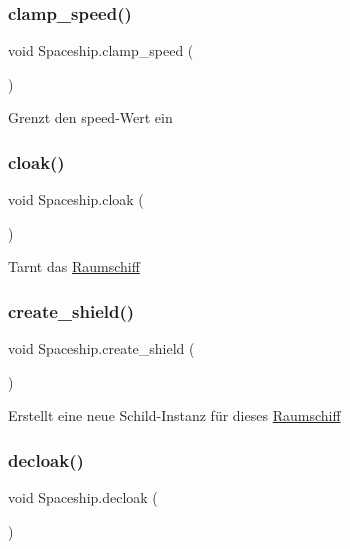 \subsubsection{\texorpdfstring{clamp\+\_\+speed()}{clamp\_speed()}}
{\footnotesize\ttfamily void Spaceship.\+clamp\+\_\+speed (\begin{DoxyParamCaption}{ }\end{DoxyParamCaption})}



Grenzt den speed-\/\+Wert ein 

\mbox{\label{class_spaceship_a06f201982238a71b99c5f065d48c3acc}} 
\subsubsection{\texorpdfstring{cloak()}{cloak()}}
{\footnotesize\ttfamily void Spaceship.\+cloak (\begin{DoxyParamCaption}{ }\end{DoxyParamCaption})}



Tarnt das \hyperlink{class_raumschiff}{Raumschiff} 

\mbox{\label{class_spaceship_a686609169faa9dec55c5da096581beec}} 
\subsubsection{\texorpdfstring{create\+\_\+shield()}{create\_shield()}}
{\footnotesize\ttfamily void Spaceship.\+create\+\_\+shield (\begin{DoxyParamCaption}{ }\end{DoxyParamCaption})}



Erstellt eine neue Schild-\/\+Instanz für dieses \hyperlink{class_raumschiff}{Raumschiff} 

\mbox{\label{class_spaceship_a46d165fefc78bd0cd729429b59a6bbb6}} 
\subsubsection{\texorpdfstring{decloak()}{decloak()}}
{\footnotesize\ttfamily void Spaceship.\+decloak (\begin{DoxyParamCaption}{ }\end{DoxyParamCaption})}



